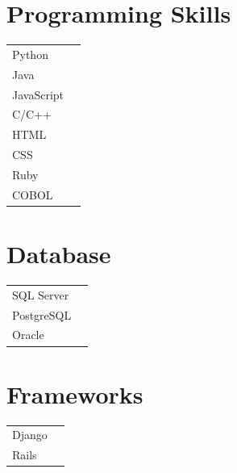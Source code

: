 \documentclass[a4paper,10pt,oneside]{article}
\begin{document}
\begin{sloppypar}
\begin{paracol}{2}
\begin{leftcolumn}
\section*{Programming Skills}
\vspace{-1em}
\begin{flushleft}
    \begin{tabular}[b]{m{13em} m{10em}}
        \Large Python &  \\
        \vspace{}
        \Large Java & \\
        \Large JavaScript & \\
        \Large C/C++ & \\
        \Large HTML &  \\
        \Large CSS &  \\
        \Large Ruby &  \\
        \Large COBOL &  \\
    \end{tabular}
\end{flushleft}

\section*{Database}
\vspace{-1em}
\begin{flushleft}
    \begin{tabular}[b]{m{13em} m{10em}}
        \Large SQL Server &  \\
        \Large PostgreSQL & \\
        \Large Oracle & \\
    \end{tabular}
\end{flushleft}

\section*{Frameworks}
\vspace{-1em}
\begin{flushleft}
    \begin{tabular}[b]{m{13em} m{10em}}
        \Large Django &  \\
        \Large Rails & \\
    \end{tabular}
\vspace{-1em}

\end{flushleft}
\end{leftcolumn}
\end{paracol}
\end{sloppypar}
\end{document}
